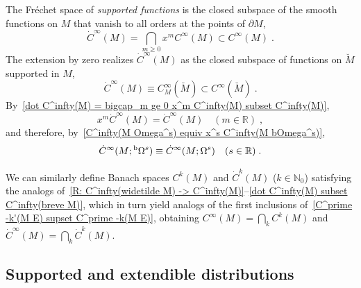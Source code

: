 \documentclass{memo-l}
\theoremstyle{plain}
\theoremstyle{definition}
\theoremstyle{remark}
\newcommand{\N}{\mathbb{N}}
\newcommand{\R}{\mathbb{R}}
\newcommand{\bOmega}{{}^{\text{\rm b}}\Omega}
\numberwithin{section}{chapter}
\numberwithin{equation}{section}%
\begin{document}
The Fr\'echet space of \emph{supported functions}  is the closed subspace of the smooth functions on $M$ that vanish to all orders at the points of $\partial M$, 
\begin{equation}\label{dot C^infty(M) = bigcap_m ge 0 x^m C^infty(M) subset C^infty(M)}
\dot C^\infty(M)=\bigcap_{m\ge0}x^mC^\infty(M)\subset C^\infty(M)\;.
\end{equation}
The extension by zero realizes $\dot C^\infty(M)$ as the closed subspace of functions on $\breve M$ supported in $M$,
\begin{equation}\label{dot C^infty(M) subset C^infty(breve M)}
\dot C^\infty(M)\equiv C^\infty_M(\breve M)\subset C^\infty(\breve M)\;.
\end{equation} 
By~\eqref{dot C^infty(M) = bigcap_m ge 0 x^m C^infty(M) subset C^infty(M)},
\begin{equation}\label{x^m dot C^infty(M) = dot C^infty(M)}
x^m\dot C^\infty(M)=\dot C^\infty(M)\quad(m\in\R)\;,
\end{equation}
and therefore, by~\eqref{C^infty(M Omega^s) equiv x^s C^infty(M bOmega^s)},
\begin{equation}\label{dot C^infty(M bOmega^s) equiv dot C^infty(M Omega^s)}
\dot C^\infty(M;\bOmega^s)\equiv\dot C^\infty(M;\Omega^s)\quad(s\in\R)\;.
\end{equation}

We can similarly define Banach spaces $C^k(M)$ and $\dot C^k(M)$ ($k\in\N_0$) satisfying the analogs of~\eqref{R: C^infty(widetilde M) -> C^infty(M)}--\eqref{dot C^infty(M) subset C^infty(breve M)}, which in turn yield analogs of the first inclusions of~\eqref{C^prime -k'(M E) supset C^prime -k(M E)}, obtaining $C^\infty(M)=\bigcap_kC^k(M)$ and $\dot C^\infty(M)=\bigcap_k\dot C^k(M)$.



\subsection{Supported and extendible distributions}\label{ss: supported and extendible distribs}
\end{document}
